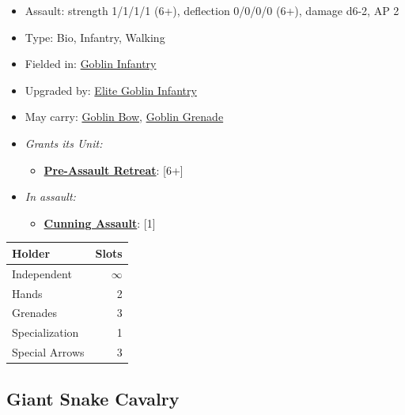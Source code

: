 \documentclass[a4paper,12pt]{article}
\begin{document}
\begin{itemize}
\item Assault: strength 1/1/1/1 (6+), deflection 0/0/0/0 (6+), damage d6-2, AP 2
\item Type: Bio, Infantry, Walking
\item Fielded in: \hyperref[unit-goblin-infantry]{Goblin Infantry}
\item Upgraded by: \hyperref[model-elite-goblin-infantry]{Elite Goblin Infantry}
\item May carry: \hyperref[equipment-goblin-bow]{Goblin Bow}, \hyperref[equipment-goblin-grenade]{Goblin Grenade}

\item \textit{Grants its Unit:}
\begin{itemize}
\item \textbf{\hyperref[rule-special-pre-assault-retreat]{Pre-Assault Retreat}}: [6+]

\end{itemize}


\item \textit{In assault:}
\begin{itemize}
\item \textbf{\hyperref[rule-special-cunning-assault]{Cunning Assault}}: [1]

\end{itemize}

\end{itemize}

\begin{tabular}{lr}
\textbf{Holder} & \textbf{Slots} \\
\hline
Independent & $\infty$ \\
Hands & 2 \\
Grenades & 3 \\
Specialization & 1 \\
Special Arrows & 3 \\
\end{tabular}
\vspace{1ex}
\subsection{Giant Snake Cavalry}
\label{model-giant-snake-cavalry}
\end{document}
